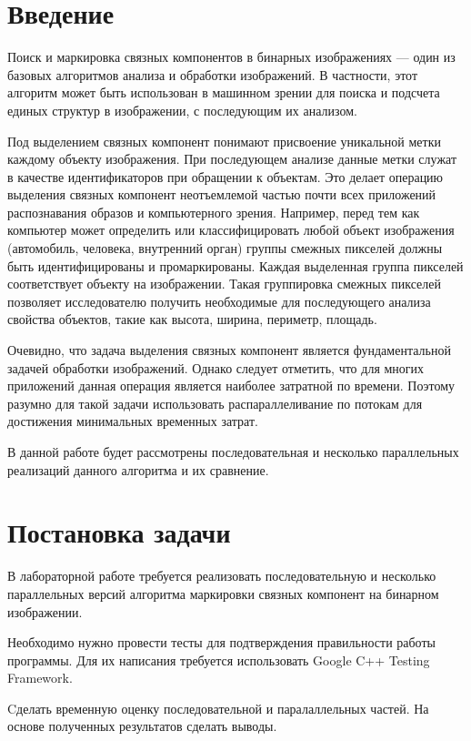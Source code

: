 \documentclass{report}
\begin{document}
	\setcounter{page}{2}


	\tableofcontents
	\newpage


	\section*{Введение}
		\par Поиск и маркировка связных компонентов в бинарных изображениях — один из базовых алгоритмов анализа и обработки изображений. В частности, этот алгоритм может быть использован в машинном зрении для поиска и подсчета единых структур в изображении, с последующим их анализом.
		\par Под выделением связных компонент понимают присвоение уникальной метки каждому объекту изображения. При последующем анализе данные метки служат в качестве идентификаторов при обращении к объектам. Это делает операцию выделения связных компонент неотъемлемой частью почти всех приложений распознавания образов и компьютерного зрения. Например, перед тем как компьютер может определить или классифицировать любой объект изображения (автомобиль, человека, внутренний орган) группы смежных пикселей должны быть идентифицированы и промаркированы. Каждая выделенная группа пикселей соответствует объекту на изображении. Такая группировка смежных пикселей позволяет исследователю получить необходимые для последующего анализа свойства объектов, такие как высота, ширина, периметр, площадь.
		\par Очевидно, что задача выделения связных компонент является фундаментальной задачей обработки изображений. Однако следует отметить, что для многих приложений данная операция является наиболее затратной по времени. Поэтому разумно для такой задачи использовать распараллеливание по потокам для достижения минимальных временных затрат.
		\par В данной работе будет рассмотрены последовательная и несколько параллельных реализаций данного алгоритма и их сравнение.
	\newpage


	\section*{Постановка задачи}
		\par В лабораторной работе требуется реализовать последовательную и несколько параллельных версий алгоритма маркировки связных компонент на бинарном изображении.
		\par Необходимо нужно провести тесты для подтверждения правильности работы программы. Для их написания требуется использовать Google C++ Testing Framework.
		\par Cделать временную оценку последовательной и паралаллельных частей. На основе полученных результатов сделать выводы.
	\newpage
\end{document}
